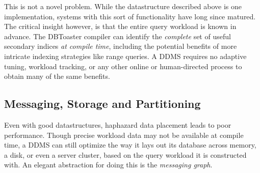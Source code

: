 
This is not a novel problem.  While the datastructure described above is one implementation, systems with this sort of functionality\cite{berkeleydb} have long since matured.  The critical insight however, is that the entire query workload is known in advance.  The DBToaster compiler can identify the \textit{complete} set of useful secondary indices \textit{at compile time}, including the potential benefits of more intricate indexing strategies like range queries\cite{rangequeries}.  A DDMS requires no adaptive tuning\cite{ChaudhuriN07}, workload tracking\cite{colt}, or any other online or human-directed process to obtain many of the same benefits.


\subsection{Messaging, Storage and Partitioning}
Even with good datastructures, haphazard data placement leads to poor performance.  Though precise workload data may not be available at compile time, a DDMS can still optimize the way it lays out its database across memory, a disk, or even a server cluster, based on the query workload it is constructed with.  An elegant abstraction for doing this is the \textit{messaging graph}.

